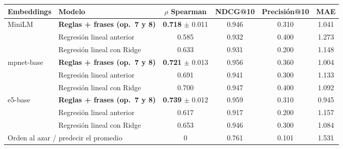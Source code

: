 \begin{tabular}{llcccc}
\toprule
Embeddings & Modelo & $\rho$ Spearman & NDCG@10 & Precisión@10 & MAE \\
\midrule
\multirow{3}{*}{MiniLM} & \textbf{Reglas + frases (op.~7 y 8)} & \textbf{0.718} $\pm$ 0.011 & 0.946 & 0.310 & 1.041 \\
 & Regresión lineal anterior & 0.585 & 0.932 & 0.400 & 1.273 \\
 & Regresión lineal con Ridge & 0.633 & 0.931 & 0.200 & 1.148 \\ \midrule
\multirow{3}{*}{mpnet-base} & \textbf{Reglas + frases (op.~7 y 8)} & \textbf{0.721} $\pm$ 0.013 & 0.956 & 0.360 & 1.004 \\
 & Regresión lineal anterior & 0.691 & 0.941 & 0.300 & 1.133 \\
 & Regresión lineal con Ridge & 0.700 & 0.947 & 0.400 & 1.092 \\ \midrule
\multirow{3}{*}{e5-base} & \textbf{Reglas + frases (op.~7 y 8)} & \textbf{0.739} $\pm$ 0.012 & 0.959 & 0.310 & 0.945 \\
 & Regresión lineal anterior & 0.617 & 0.917 & 0.200 & 1.157 \\
 & Regresión lineal con Ridge & 0.653 & 0.946 & 0.300 & 1.084 \\ \midrule
\multicolumn{2}{l}{Orden al azar / predecir el promedio} & 0 & 0.761 & 0.101 & 1.531 \\
\bottomrule
\end{tabular}
